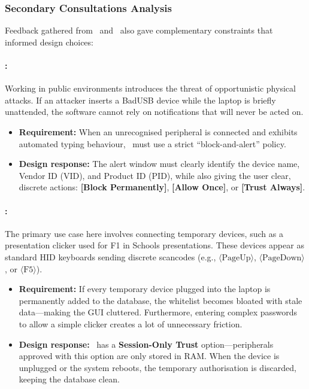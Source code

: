 \subsubsection{Secondary Consultations Analysis}

Feedback gathered from \stakeholdersSU\ and \stakeholdersTU\ also gave complementary constraints that informed design choices:

\paragraph{\stakeholdersSU:}
Working in public environments introduces the threat of opportunistic physical attacks. If an attacker inserts a BadUSB device while the laptop is briefly unattended, the software cannot rely on notifications that will never be acted on.
\begin{itemize}
	\item \textbf{Requirement:} When an unrecognised peripheral is connected and exhibits automated typing behaviour, \projectNameFormatted\ must use a strict ``block-and-alert'' policy.
	\item \textbf{Design response:} The alert window must clearly identify the device name, Vendor ID (VID), and Product ID (PID), while also giving the user clear, discrete actions: \textbf{[Block Permanently]}, \textbf{[Allow Once]}, or \textbf{[Trust Always]}.
\end{itemize}

\paragraph{\stakeholdersTU:}
The primary use case here involves connecting temporary devices, such as a presentation clicker used for F1 in Schools presentations. These devices appear as standard HID keyboards sending discrete scancodes (e.g., $\langle\text{PageUp}\rangle$, $\langle\text{PageDown}\rangle$, or $\langle\text{F5}\rangle$).
\begin{itemize}
	\item \textbf{Requirement:} If every temporary device plugged into the laptop is permanently added to the database, the whitelist becomes bloated with stale data---making the GUI cluttered. Furthermore, entering complex passwords to allow a simple clicker creates a lot of unnecessary friction.
	\item \textbf{Design response:} \projectNameFormatted\ has a \textbf{Session-Only Trust} option---peripherals approved with this option are only stored in RAM. When the device is unplugged or the system reboots, the temporary authorisation is discarded, keeping the database clean.
\end{itemize}

